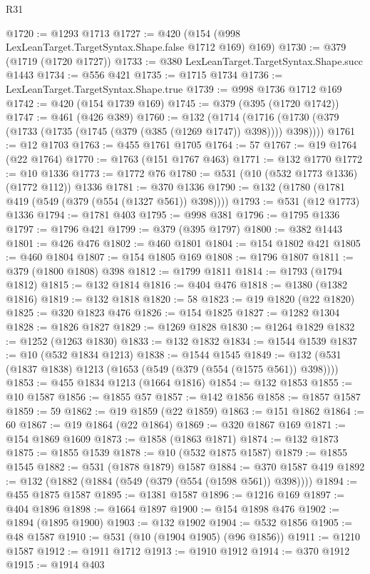 \begin{lexlean}{R31}
\begin{coremodule}
@1720 := @1293 @1713
@1727 := @420 (@154 (@998 LexLeanTarget.TargetSyntax.Shape.false @1712 @169) @169)
@1730 := @379 (@1719 (@1720 @1727))
@1733 := @380 LexLeanTarget.TargetSyntax.Shape.succ @1443
@1734 := @556 @421
@1735 := @1715 @1734
@1736 := LexLeanTarget.TargetSyntax.Shape.true
@1739 := @998 @1736 @1712 @169
@1742 := @420 (@154 @1739 @169)
@1745 := @379 (@395 (@1720 @1742))
@1747 := @461 (@426 @389)
@1760 := @132
    (@1714 (@1716 (@1730 (@379 (@1733 (@1735 (@1745 (@379 (@385 (@1269 @1747)) @398)))) @398))))
@1761 := @12 @1703
@1763 := @455 @1761 @1705
@1764 := 57
@1767 := @19 @1764 (@22 @1764)
@1770 := @1763 (@151 @1767 @463)
@1771 := @132 @1770
@1772 := @10 @1336
@1773 := @1772 @76
@1780 := @531 (@10 (@532 @1773 @1336) (@1772 @112)) @1336
@1781 := @370 @1336
@1790 := @132 (@1780 (@1781 @419 (@549 (@379 (@554 (@1327 @561)) @398))))
@1793 := @531 (@12 @1773) @1336
@1794 := @1781 @403
@1795 := @998 @381
@1796 := @1795 @1336
@1797 := @1796 @421
@1799 := @379 (@395 @1797)
@1800 := @382 @1443
@1801 := @426 @476
@1802 := @460 @1801
@1804 := @154 @1802 @421
@1805 := @460 @1804
@1807 := @154 @1805 @169
@1808 := @1796 @1807
@1811 := @379 (@1800 @1808) @398
@1812 := @1799 @1811
@1814 := @1793 (@1794 @1812)
@1815 := @132 @1814
@1816 := @404 @476
@1818 := @1380 (@1382 @1816)
@1819 := @132 @1818
@1820 := 58
@1823 := @19 @1820 (@22 @1820)
@1825 := @320 @1823 @476
@1826 := @154 @1825
@1827 := @1282 @1304
@1828 := @1826 @1827
@1829 := @1269 @1828
@1830 := @1264 @1829
@1832 := @1252 (@1263 @1830)
@1833 := @132 @1832
@1834 := @1544 @1539
@1837 := @10 (@532 @1834 @1213)
@1838 := @1544 @1545
@1849 := @132 (@531 (@1837 @1838) @1213 (@1653 (@549 (@379 (@554 (@1575 @561)) @398))))
@1853 := @455 @1834 @1213 (@1664 @1816)
@1854 := @132 @1853
@1855 := @10 @1587
@1856 := @1855 @57
@1857 := @142 @1856
@1858 := @1857 @1587
@1859 := 59
@1862 := @19 @1859 (@22 @1859)
@1863 := @151 @1862
@1864 := 60
@1867 := @19 @1864 (@22 @1864)
@1869 := @320 @1867 @169
@1871 := @154 @1869 @1609
@1873 := @1858 (@1863 @1871)
@1874 := @132 @1873
@1875 := @1855 @1539
@1878 := @10 (@532 @1875 @1587)
@1879 := @1855 @1545
@1882 := @531 (@1878 @1879) @1587
@1884 := @370 @1587 @419
@1892 := @132 (@1882 (@1884 (@549 (@379 (@554 (@1598 @561)) @398))))
@1894 := @455 @1875 @1587
@1895 := @1381 @1587
@1896 := @1216 @169
@1897 := @404 @1896
@1898 := @1664 @1897
@1900 := @154 @1898 @476
@1902 := @1894 (@1895 @1900)
@1903 := @132 @1902
@1904 := @532 @1856
@1905 := @48 @1587
@1910 := @531 (@10 (@1904 @1905) (@96 @1856))
@1911 := @1210 @1587
@1912 := @1911 @1712
@1913 := @1910 @1912
@1914 := @370 @1912
@1915 := @1914 @403

\end{coremodule}
\end{lexlean}
